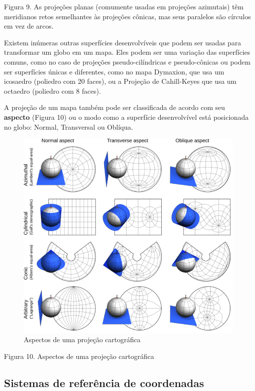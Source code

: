 \documentclass[
  portuguese,
]{krantz}
\begin{document}
Figura 9. As projeções planas (comumente usadas em projeções azimutais) têm meridianos retos semelhantes às projeções cônicas, mas seus paralelos são círculos em vez de arcos.

Existem inúmeras outras superfícies desenvolvíveis que podem ser usadas para transformar um globo em um mapa. Eles podem ser uma variação das superfícies comuns, como no caso de projeções pseudo-cilíndricas e pseudo-cônicas ou podem ser superfícies únicas e diferentes, como no mapa Dymaxion, que usa um icosaedro (poliedro com 20 faces), ou a Projeção de Cahill-Keyes que usa um octaedro (poliedro com 8 faces).

A projeção de um mapa também pode ser classificada de acordo com seu \textbf{aspecto} (Figura 10) ou o modo como a superfície desenvolvível está posicionada no globo: Normal, Transversal ou Oblíqua.

\begin{figure}
\centering
\includegraphics{media/modulo0/aspects.png}
\caption{Aspectos de uma projeção cartográfica}
\end{figure}

Figura 10. Aspectos de uma projeção cartográfica

\hypertarget{sistemas-de-referuxeancia-de-coordenadas}{%
\subsection{Sistemas de referência de coordenadas}\label{sistemas-de-referuxeancia-de-coordenadas}}
\end{document}
